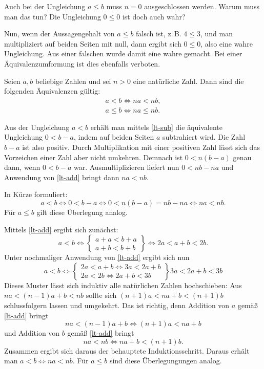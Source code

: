 Auch bei der Ungleichung $a\le b$ muss $n=0$ ausgeschlossen werden.
Warum muss man das tun? Die Ungleichung $0\le 0$ ist doch auch
wahr?

Nun, wenn der Aussagengehalt von $a\le b$ falsch ist, z.\,B. $4\le 3$,
und man multipliziert auf beiden Seiten mit null, dann ergibt sich
$0\le 0$, also eine wahre Ungleichung. Aus einer falschen wurde damit
eine wahre gemacht. Bei einer Äquivalenzumformung ist dies ebenfalls
verboten.

\begin{Satz}
Seien $a,b$ beliebige Zahlen und sei $n>0$ eine natürliche Zahl.
Dann sind die folgenden Äquivalenzen gültig:
\begin{gather}
\label{lt-mul-nat} a<b\iff na<nb,\\
\label{le-mul-nat} a\le b\iff na\le nb.
\end{gather}
\end{Satz}

\noindent{}
Aus der Ungleichung $a<b$ erhält man mittels \eqref{lt-sub} die
äquivalente Ungleichung $0<b-a$, indem auf beiden Seiten $a$
subtrahiert wird. Die Zahl $b-a$ ist also positiv. Durch Multiplikation
mit einer positiven Zahl lässt sich das Vorzeichen einer Zahl
aber nicht umkehren. Demnach ist $0<n(b-a)$ genau dann,
wenn $0<b-a$ war. Ausmultiplizieren liefert nun
$0<nb-na$ und Anwendung von \eqref{lt-add} bringt dann $na<nb$.

In Kürze formuliert:
\begin{equation}
a<b\iff 0<b-a\iff 0<n(b-a)=nb-na \iff na<nb.
\end{equation}
Für $a\le b$ gilt diese Überlegung analog.\;\qedsymbol

Mittels \eqref{lt-add} ergibt sich zunächst:
\begin{equation}
a<b\iff \left\{
\begin{matrix}
a+a<b+a\\
a+b<b+b
\end{matrix}
\right\}
\iff 2a<a+b<2b.
\end{equation}
Unter nochmaliger Anwendung von \eqref{lt-add} ergibt sich
nun
\begin{equation}
a<b\iff \left\{
\begin{matrix}
2a<a+b \iff 3a<2a+b\\
2a<2b \iff 2a+b<3b
\end{matrix}
\right\} 3a<2a+b<3b
\end{equation}
Dieses Muster lässt sich induktiv alle natürlichen Zahlen hochschieben:
Aus $na<(n-1)a+b<nb$ sollte sich
$(n+1)a<na+b<(n+1)b$ schlussfolgern lassen und umgekehrt.
Das ist richtig, denn Addition von $a$ gemäß \eqref{lt-add} bringt
\begin{equation}
na<(n-1)a+b \iff (n+1)a < na+b
\end{equation}
und Addition von $b$ gemäß \eqref{lt-add} bringt
\begin{equation}
na<nb \iff na+b < (n+1)b.
\end{equation}
Zusammen ergibt sich daraus der behauptete Induktionsschritt. 
Daraus erhält man $a<b\iff na<nb$. Für $a\le b$ sind diese
Überlegungungen analog.\;\qedsymbol

